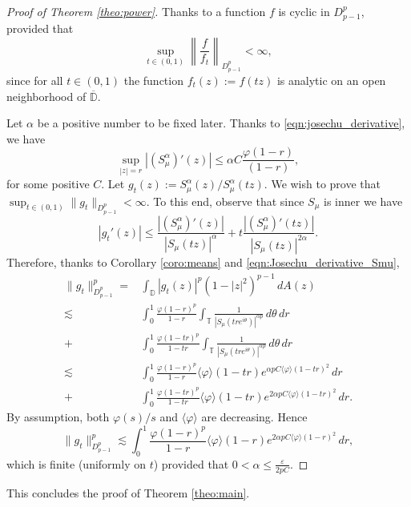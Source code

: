 \documentclass{birkjour}
\numberwithin{equation}{section}
\theoremstyle{plain}
\theoremstyle{definition}
\newcommand{\T}{\mathbb{T}}
\newcommand{\D}{\mathbb{D}}
\newcommand{\1}{\mathds{1}}
\newcommand{\charphi}{\langle \varphi\rangle}
\begin{document}
 \begin{proof}[Proof of Theorem \ref{theo:power}]
  Thanks to \cite[Proposition 5]{BrownShields84} a function $f$ is cyclic in $D^p_{p-1}$, provided that 
\begin{equation}
\label{eqn:dilated}
\sup_{t\in(0, 1)}\left\|\frac{f}{f_t} \right\|_{D^p_{p-1}}<\infty,
\end{equation}
since for all $t\in(0, 1)$ the function $f_t(z):=f(tz)$ is analytic on an open neighborhood of $\overline{\D}$. 

Let $\alpha$ be a positive number to be fixed later. Thanks to \eqref{eqn:josechu_derivative}, we have
\begin{equation}
\label{eqn:Josechu_derivative_Smu}
\sup_{|z|=r}|(S^\alpha_\mu)'(z)|\leq \alpha C \frac{\varphi(1-r)}{(1-r)},
\end{equation}
for some positive $C$.
Let $g_t(z):=S^\alpha_\mu(z)/S^\alpha_\mu(tz)$. We wish to prove that $\sup_{t\in(0, 1)}\|g_t\|_{D^p_{p-1}}<\infty$. To this end, observe that since $S_\mu$ is inner we have 
\[
|g_t'(z)|\le\frac{|(S^\alpha_\mu)'(z)|}{|S_\mu(tz)|^\alpha}+t\frac{|(S^\alpha_\mu)'(tz)|}{|S_\mu(tz)|^{2\alpha}}.
\]
Therefore, thanks to Corollary \ref{coro:means} and \eqref{eqn:Josechu_derivative_Smu},
\[
\begin{split}
\|g_t\|_{D^p_{p-1}}^p=&\int_\D|g_t(z)|^p(1-|z|^2)^{p-1}\,dA(z)\\
\lesssim&\int_0^1\frac{\varphi(1-r)^p}{1-r}\int_\T\frac{1}{|S_\mu(tre^{i
\theta})|^{\alpha p}}\,d\theta\,dr \\+&\int_0^1\frac{\varphi(1-tr)^p}{1-tr}\int_\T\frac{1}{|S_\mu(tre^{i
\theta})|^{\alpha p}}\,d\theta\,dr\\
\lesssim&\int_0^1\frac{\varphi(1-r)^p}{1-r}\charphi(1-tr)e^{\alpha p C\charphi(1-tr)^2}\,dr \\ +&\int_0^1\frac{\varphi(1-tr)^p}{1-tr}\charphi(1-tr)e^{2\alpha p C\charphi(1-tr)^2}\,dr.
\end{split}
\]
By assumption, both $\varphi(s)/s$ and $\charphi$ are decreasing. Hence 
\[
\|g_t\|_{D^p_{p-1}}^p\lesssim\int_0^1\frac{\varphi(1-r)^p}{1-r}\charphi(1-r)e^{2\alpha p C\charphi(1-r)^2}\,dr, 
\]
which is finite (uniformly on $t$) provided that $0<\alpha\le\frac{\varepsilon}{2pC}$. 
\end{proof}
This concludes the proof of Theorem \ref{theo:main}.
\end{document}
